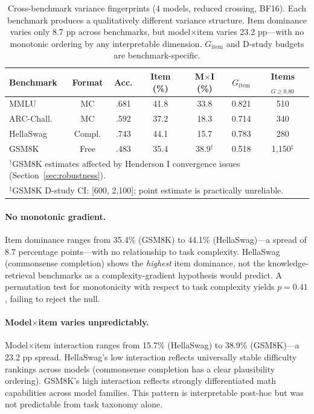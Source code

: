 \documentclass[11pt]{article}
\begin{document}
\begin{table}[t]
\centering
\caption{Cross-benchmark variance fingerprints (4 models, reduced crossing, BF16). Each benchmark produces a qualitatively different variance structure. Item dominance varies only 8.7 pp across benchmarks, but model$\times$item varies 23.2 pp---with no monotonic ordering by any interpretable dimension. $G_{\text{item}}$ and D-study budgets are benchmark-specific.}
\label{tab:crossbenchmark}
\small
\begin{tabular}{lcccccc}
\toprule
\textbf{Benchmark} & \textbf{Format} & \textbf{Acc.} & \textbf{Item (\%)} & \textbf{M$\times$I (\%)} & $G_{\text{item}}$ & \textbf{Items}$_{G \geq 0.80}$ \\
\midrule
MMLU       & MC       & .681 & 41.8 & 33.8 & 0.821 & 510 \\
ARC-Chall. & MC       & .592 & 37.2 & 18.3 & 0.714 & 340 \\
HellaSwag  & Compl.   & .743 & 44.1 & 15.7 & 0.783 & 280 \\
GSM8K      & Free     & .483 & 35.4 & 38.9$^\dagger$ & 0.518 & 1{,}150$^\ddagger$ \\
\bottomrule
\multicolumn{7}{l}{\footnotesize $^\dagger$GSM8K estimates affected by Henderson I convergence issues (Section~\ref{sec:robustness}).} \\
\multicolumn{7}{l}{\footnotesize $^\ddagger$GSM8K D-study CI: [600, 2{,}100]; point estimate is practically unreliable.}
\end{tabular}
\end{table}

\paragraph{No monotonic gradient.}
Item dominance ranges from 35.4\% (GSM8K) to 44.1\% (HellaSwag)---a spread of 8.7 percentage points---with no relationship to task complexity.
HellaSwag (commonsense completion) shows the \emph{highest} item dominance, not the knowledge-retrieval benchmarks as a complexity-gradient hypothesis would predict.
A permutation test for monotonicity with respect to task complexity yields $p = 0.41$, failing to reject the null.

\paragraph{Model$\times$item varies unpredictably.}
Model$\times$item interaction ranges from 15.7\% (HellaSwag) to 38.9\% (GSM8K)---a 23.2 pp spread.
HellaSwag's low interaction reflects universally stable difficulty rankings across models (commonsense completion has a clear plausibility ordering).
GSM8K's high interaction reflects strongly differentiated math capabilities across model families.
This pattern is interpretable post-hoc but was not predictable from task taxonomy alone.
\end{document}
